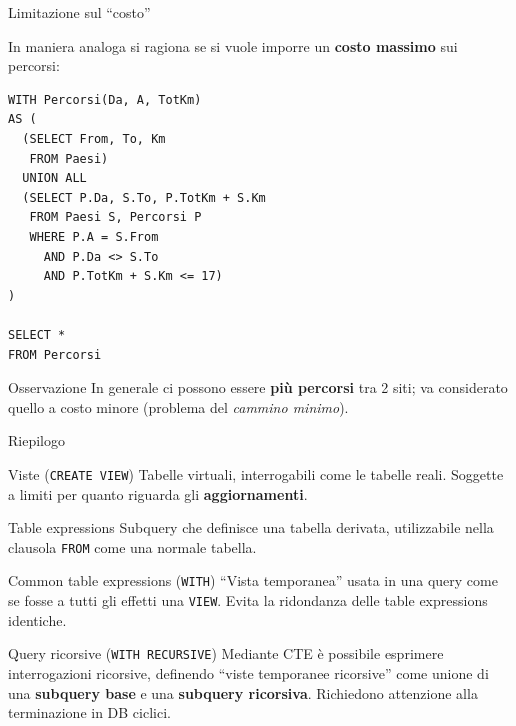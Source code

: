 \documentclass[aspectratio=169]{beamer}
\begin{document}
\begin{frame}[fragile]{Limitazione sul ``costo''}

In maniera analoga si ragiona se si vuole imporre un \textbf{costo massimo} sui percorsi:

\begin{lstlisting}
WITH Percorsi(Da, A, TotKm)
AS (
  (SELECT From, To, Km
   FROM Paesi)
  UNION ALL
  (SELECT P.Da, S.To, P.TotKm + S.Km
   FROM Paesi S, Percorsi P
   WHERE P.A = S.From
     AND P.Da <> S.To
     AND P.TotKm + S.Km <= 17)
)

SELECT *
FROM Percorsi
\end{lstlisting}

\begin{block}{Osservazione}
In generale ci possono essere \textbf{più percorsi} tra 2 siti; va considerato quello a costo minore (problema del \textit{cammino minimo}).
\end{block}

\end{frame}

\begin{frame}{Riepilogo}

\begin{block}{Viste (\texttt{CREATE VIEW})}
Tabelle virtuali, interrogabili come le tabelle reali. Soggette a limiti per quanto riguarda gli \textbf{aggiornamenti}.
\end{block}

\begin{block}{Table expressions}
Subquery che definisce una tabella derivata, utilizzabile nella clausola \texttt{FROM} come una normale tabella.
\end{block}

\begin{block}{Common table expressions (\texttt{WITH})}
``Vista temporanea'' usata in una query come se fosse a tutti gli effetti una \texttt{VIEW}. Evita la ridondanza delle table expressions identiche.
\end{block}

\begin{block}{Query ricorsive (\texttt{WITH RECURSIVE})}
Mediante CTE è possibile esprimere interrogazioni ricorsive, definendo ``viste temporanee ricorsive'' come unione di una \textbf{subquery base} e una \textbf{subquery ricorsiva}. Richiedono attenzione alla terminazione in DB ciclici.
\end{block}

\end{frame}
\end{document}
